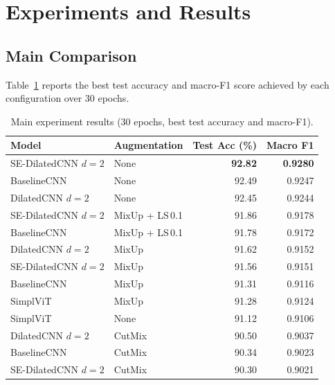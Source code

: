 \documentclass[10pt,a4paper]{article}
\begin{document}
\section{Experiments and Results}

\subsection{Main Comparison}

Table~\ref{tab:main} reports the best test accuracy and macro-F1 score achieved by each configuration over 30 epochs.

\begin{table}[H]
  \centering
  \caption{Main experiment results (30 epochs, best test accuracy and macro-F1).}
  \label{tab:main}
  \begin{tabular}{llrr}
    \toprule
    \textbf{Model} & \textbf{Augmentation} & \textbf{Test Acc (\%)} & \textbf{Macro F1} \\
    \midrule
    SE-DilatedCNN $d=2$ & None            & \textbf{92.82} & \textbf{0.9280} \\
    BaselineCNN         & None            & 92.49 & 0.9247 \\
    DilatedCNN $d=2$    & None            & 92.45 & 0.9244 \\
    \midrule
    SE-DilatedCNN $d=2$ & MixUp + LS\,0.1 & 91.86 & 0.9178 \\
    BaselineCNN         & MixUp + LS\,0.1 & 91.78 & 0.9172 \\
    DilatedCNN $d=2$    & MixUp           & 91.62 & 0.9152 \\
    SE-DilatedCNN $d=2$ & MixUp           & 91.56 & 0.9151 \\
    BaselineCNN         & MixUp           & 91.31 & 0.9116 \\
    SimplViT            & MixUp           & 91.28 & 0.9124 \\
    SimplViT            & None            & 91.12 & 0.9106 \\
    \midrule
    DilatedCNN $d=2$    & CutMix          & 90.50 & 0.9037 \\
    BaselineCNN         & CutMix          & 90.34 & 0.9023 \\
    SE-DilatedCNN $d=2$ & CutMix          & 90.30 & 0.9021 \\
    \bottomrule
  \end{tabular}
\end{table}
\end{document}
